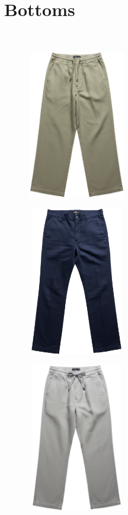 \documentclass[10pt]{article}
\begin{document}
\section*{Bottoms}\
\vspace*{2mm}\noindent
\begin{minipage}[c][64.75mm][c]{64.75mm}\centering
\includegraphics[width=64.75mm,height=64.75mm,keepaspectratio]{assets/pants/green-linen-pants.png}\
\end{minipage} \hspace*{6.00mm} \begin{minipage}[c][64.75mm][c]{64.75mm}\centering
\includegraphics[width=64.75mm,height=64.75mm,keepaspectratio]{assets/pants/navy-linen-pants.png}\
\end{minipage} \hspace*{6.00mm} \begin{minipage}[c][64.75mm][c]{64.75mm}\centering
\includegraphics[width=64.75mm,height=64.75mm,keepaspectratio]{assets/pants/grey-linen-pants.png}\

\end{minipage}
\end{document}
